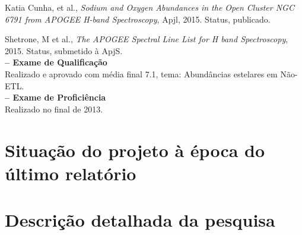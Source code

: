 \documentclass[a4paper,12pt,twoside]{article}
\begin{document}
Katia Cunha, et al., \textit{Sodium and Oxygen Abundances in the Open Cluster NGC 6791 from APOGEE H-band Spectroscopy}, Apjl, 2015. Status, publicado.

Shetrone, M et al., \textit{The APOGEE Spectral Line List for H band Spectroscopy}, 2015. Status, submetido \`a ApjS.\\

{\bf \large -- Exame de Qualificação}\\

Realizado e aprovado com média final 7.1, tema: Abundâncias estelares em Não-ETL.\\

{\bf \large -- Exame de Proficiência}\\

Realizado no final de 2013.\\




\newpage
\section{Situação do projeto à época do último relatório}





\newpage
\section{Descrição detalhada da pesquisa}




\end{document}
